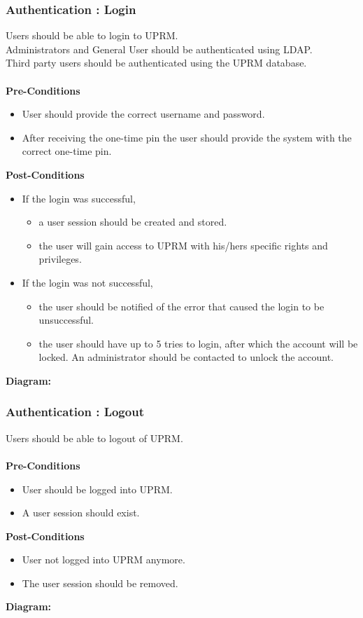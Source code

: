 \subsubsection{Authentication : Login}
Users should be able to login to UPRM.\\
Administrators and General User should be authenticated using LDAP. \\
Third party users should be authenticated using the UPRM database.\\ \\
\textbf{Pre-Conditions}
\begin{itemize}
	\item User should provide the correct username and password.
	\item After receiving the one-time pin the user should provide the system with the correct one-time pin.
\end{itemize}
\textbf{Post-Conditions}
\begin{itemize}
	\item If the login was successful,
		\begin{itemize}
			\item a user session should be created and stored.
			\item the user will gain access to UPRM with his/hers specific rights and privileges.
		\end{itemize} 
	\item If the login was not successful,
			\begin{itemize}
				\item the user should be notified of the error that caused the login to be unsuccessful.
				\item the user should have up to 5 tries to login, after which the account will be locked. An administrator should be contacted to unlock the account.
			\end{itemize} 
\end{itemize}
\textbf{Diagram:}\\
\centerline{}

\subsubsection{Authentication : Logout}
Users should be able to logout of UPRM.\\ \\
\textbf{Pre-Conditions}
\begin{itemize}
	\item User should be logged into UPRM.
	\item A user session should exist.
\end{itemize}
\textbf{Post-Conditions}
\begin{itemize}
	\item User not logged into UPRM anymore.
	\item The user session should be removed.
\end{itemize}
\textbf{Diagram:}\\
\centerline{}
